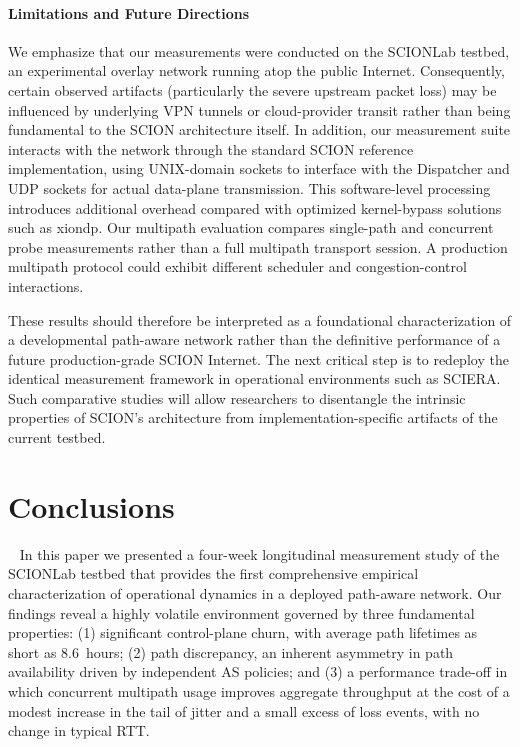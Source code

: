 \documentclass[pdflatex,sn-vancouver-num]{sn-jnl}%
\theoremstyle{thmstyleone}%
\theoremstyle{thmstyletwo}%
\theoremstyle{thmstylethree}%
\begin{document}
\paragraph{Limitations and Future Directions}
We emphasize that our measurements were conducted on the SCIONLab testbed, an experimental overlay network running atop the public Internet. Consequently, certain observed artifacts (particularly the severe upstream packet loss) may be influenced by underlying VPN tunnels or cloud-provider transit rather than being fundamental to the SCION architecture itself. In addition, our measurement suite interacts with the network through the standard SCION reference implementation, using UNIX-domain sockets to interface with the Dispatcher and UDP sockets for actual data-plane transmission. This software-level processing introduces additional overhead compared with optimized kernel-bypass solutions such as xiondp. Our multipath evaluation compares single-path and concurrent probe measurements rather than a full multipath transport session. A production multipath protocol could exhibit different scheduler and congestion-control interactions.

These results should therefore be interpreted as a foundational characterization of a developmental path-aware network rather than the definitive performance of a future production-grade SCION Internet. The next critical step is to redeploy the identical measurement framework in operational environments such as SCIERA. Such comparative studies will allow researchers to disentangle the intrinsic properties of SCION's architecture from implementation-specific artifacts of the current testbed.

\section{Conclusions}~\label{sec::conclusion}
In this paper we presented a four-week longitudinal measurement study of the SCIONLab testbed that provides the first comprehensive empirical characterization of operational dynamics in a deployed path-aware network. Our findings reveal a highly volatile environment governed by three fundamental properties: (1) significant control-plane churn, with average path lifetimes as short as 8.6~hours; (2) path discrepancy, an inherent asymmetry in path availability driven by independent AS policies; and (3) a performance trade-off in which concurrent multipath usage improves aggregate throughput at the cost of a modest increase in the tail of jitter and a small excess of loss events, with no change in typical RTT.
\end{document}
